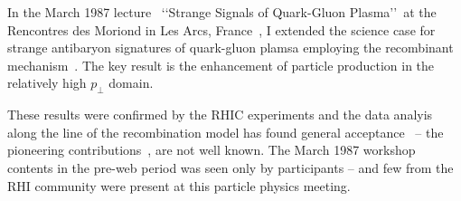 In the March 1987  lecture~\cite{Rafelski:1987bx} \lq\lq Strange Signals of Quark-Gluon Plasma\rq\rq\ at the Rencontres des Moriond in Les Arcs, France~\cite{TranThanhVan:1987tm}, I extended  the science case for strange antibaryon signatures of quark-gluon plamsa employing the recombinant mechanism~\cite{Koch:1986ud,Rafelski:1987un}. The key result is the enhancement of particle production in  the relatively high $p_\bot$ domain.

These results were confirmed by the RHIC experiments and the data analyis along the line of the recombination model has found general acceptance~\cite{Fries:2003vb,Fries:2003kq} -- the pioneering contributions~\cite{Rafelski:1987un,Rafelski:1987bx}, are not well known. The March 1987 workshop  contents in the pre-web period was seen only by participants -- and few from the RHI community were present at this particle physics meeting. \\ 

